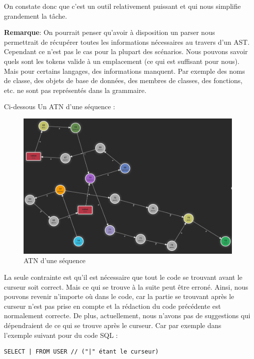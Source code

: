\documentclass[
    iict, %
    il, %
]{heig-tb}
\begin{document}
On constate donc que c'est un outil relativement puissant et qui nous simplifie grandement la tâche.

\textbf{Remarque}: On pourrait penser qu'avoir à disposition un parser nous permettrait de récupérer toutes les informations nécessaires au travers d'un AST. Cependant ce n'est pas le cas pour la plupart des scénarios.
Nous pouvons savoir quels sont les tokens valide à un emplacement (ce qui est suffisant pour nous). Mais pour certains langages, des informations manquent. Par exemple des noms de classe, des objets de base de données, des membres de classes, des fonctions, etc. ne sont pas représentés dans la grammaire. 

Ci-dessous Un ATN d'une séquence :

\begin{figure}[!ht]
    \begin{center}
        \includegraphics[width=12cm]{assets/figures/seq_ATN.png}
    \end{center}
    \caption[ATN d'une séquence]{\label{seq_ATN} ATN d'une séquence}
\end{figure}

La seule contrainte est qu'il est nécessaire que tout le code se trouvant avant le curseur soit correct. Mais ce qui se trouve à la suite peut être erroné.
Ainsi, nous pouvons revenir n'importe où dans le code, car la partie se trouvant après le curseur n'est pas prise en compte et la rédaction du code précédente est normalement correcte.
De plus, actuellement, nous n'avons pas de suggestions qui dépendraient de ce qui se trouve après le curseur.
Car par exemple dans l'exemple suivant pour du code SQL :

\begin{lstlisting}[frame=single]
SELECT | FROM USER // ("|" étant le curseur)
\end{lstlisting}
\end{document}
